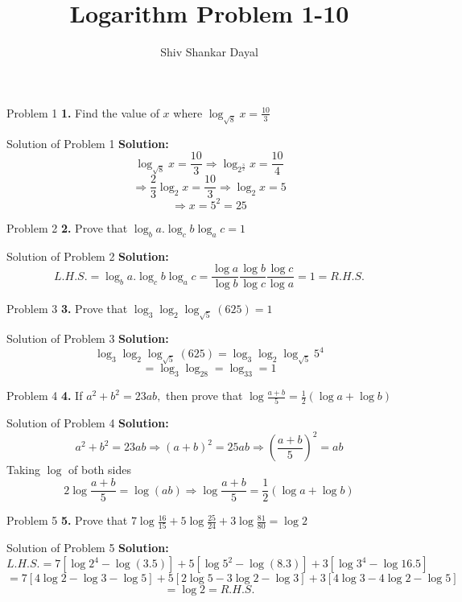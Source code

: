 \documentclass[aspectratio=169,8pt]{beamer}
\title{Logarithm Problem 1-10}
\author[Shiv Shankar Dayal]{Shiv Shankar Dayal}
\begin{document}
\begin{frame}
  \titlepage
\end{frame}
\begin{frame}{Problem 1}
  \textbf{1.} Find the value of $x$ where $\log_{\sqrt{8}}x = \frac{10}{3}$
\end{frame}
\begin{frame}{Solution of Problem 1}
  \textbf{Solution:} $$\log_{\sqrt{8}}x = \frac{10}{3}\Rightarrow \log_{2^{\frac{3}{2}}}x = \frac{10}{4}$$
  $$\Rightarrow \frac{2}{3}\log_2 x = \frac{10}{3}\Rightarrow \log_2x = 5$$
  $$\Rightarrow x = 5^2 = 25$$
\end{frame}
\begin{frame}{Problem 2}
  \textbf{2.} Prove that $\log_ba.\log_cb\log_ac = 1$
\end{frame}
\begin{frame}{Solution of Problem 2}
  \textbf{Solution:} $$L.H.S. = \log_ba.\log_cb\log_ac = \frac{\log a}{\log b}\frac{\log b}{\log c}\frac{\log c}{\log a} = 1 = R.H.S.$$
\end{frame}
\begin{frame}{Problem 3}
  \textbf{3.} Prove that $\log_3\log_2\log_{\sqrt{5}}(625) = 1$
\end{frame}
\begin{frame}{Solution of Problem 3}
  \textbf{Solution:} $$\log_3\log_2\log_{\sqrt{5}}(625) = \log_3\log_2\log_{\sqrt{5}}5^4$$
  $$= \log_3\log_28 = \log_33 = 1$$
\end{frame}
\begin{frame}{Problem 4}
  \textbf{4.} If $a^2 + b^2 = 23ab,$ then prove that $\log \frac{a + b}{5} = \frac{1}{2}(\log a + \log b)$
\end{frame}
\begin{frame}{Solution of Problem 4}
  \textbf{Solution:} $$a^2 + b^2 = 23ab \Rightarrow (a + b)^2 = 25ab \Rightarrow \left(\frac{a + b}{5}\right)^2 = ab$$
  Taking $\log$ of both sides
  $$2\log\frac{a + b}{5} = \log(ab) \Rightarrow \log \frac{a + b}{5} = \frac{1}{2}(\log a + \log b)$$
\end{frame}
\begin{frame}{Problem 5}
  \textbf{5.} Prove that $7\log\frac{16}{15}+ 5\log\frac{25}{24} + 3\log\frac{81}{80} = \log 2$
\end{frame}
\begin{frame}{Solution of Problem 5}
  \textbf{Solution:} $$L.H.S. = 7[\log 2^4 - \log(3.5)] + 5[\log 5^2 - \log(8.3)] + 3[\log 3^4 - \log 16.5]$$
  $$= 7[4\log 2 - \log 3 - \log 5] + 5[2\log 5 - 3\log 2 - \log 3] + 3[4\log 3 - 4\log 2 - \log 5]$$
  $$= \log 2 = R.H.S.$$
\end{frame}
\end{document}
